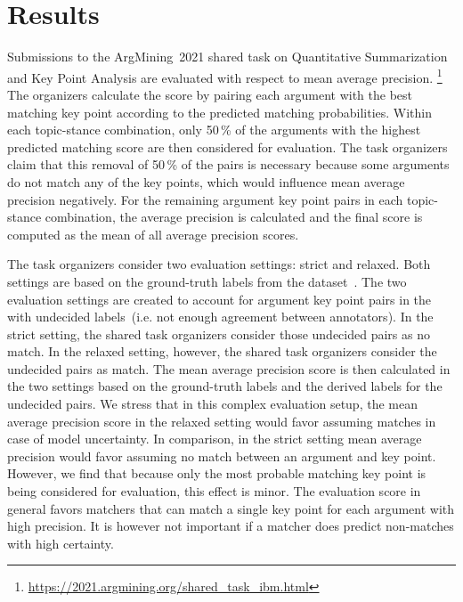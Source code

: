 \section{Results}\label{results}


Submissions to the ArgMining~2021 shared task on Quantitative Summarization and Key Point Analysis are evaluated with 
respect to mean average precision.%
\footnote{\url{https://2021.argmining.org/shared_task_ibm.html}}
The organizers calculate the score by pairing each argument with the best matching key point according to the predicted 
matching probabilities.
Within each topic-stance combination, only 50\,\% of the arguments with the highest predicted matching score are then 
considered for evaluation.
The task organizers claim that this removal of 50\,\% of the pairs is necessary because some arguments do not match any 
of the key points, which would influence mean average precision negatively. %
For the remaining argument key point pairs in each topic-stance combination, the average precision is calculated and the 
final score is computed as the mean of all average precision scores.

The task organizers consider two evaluation settings: strict and relaxed.
Both settings are based on the ground-truth labels from the \ArgKP dataset~\cite{Bar-HaimEFKLS2020}. The two evaluation settings are created to account for argument key point pairs in the \ArgKP with undecided labels~(i.e. not enough agreement between annotators). In the strict setting,
the shared task organizers consider those undecided pairs as no match. In the relaxed setting, however, the shared task organizers consider the undecided pairs as match. %
The mean average precision score is then calculated in the two settings based on the ground-truth labels and the derived labels for the undecided pairs. 
We stress that in this complex evaluation setup, the mean average precision score in the relaxed setting would 
favor assuming matches in case of model uncertainty.
In comparison, in the strict setting mean average precision would favor assuming no match between an argument and key point.
However, we find that because only the most probable matching key point is being considered for evaluation, this effect is minor.
The evaluation score in general favors matchers that can match a single key point for each argument with high precision.
It is however not important if a matcher does predict non-matches with high certainty.

